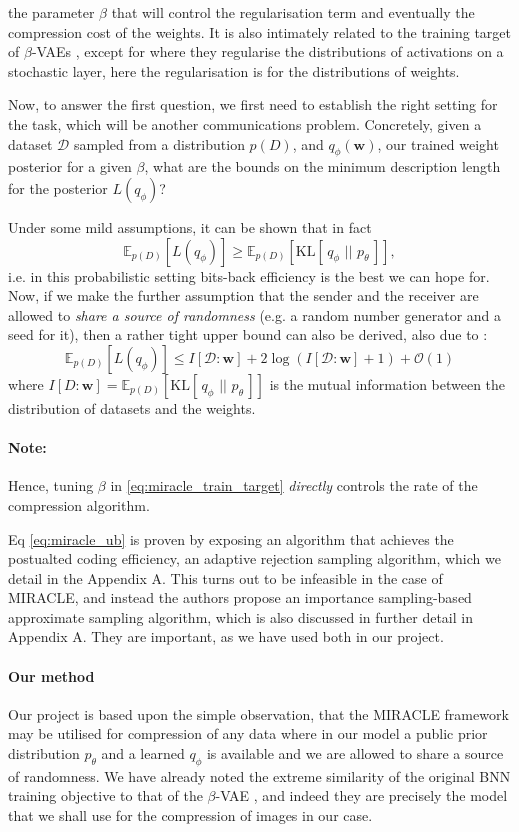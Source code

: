 \documentclass{article}
\renewcommand{\vec}[1]{\mathbf{#1}}
\newcommand{\Oh}{\mathcal{O}}
\newcommand{\KL}[2]{\mathrm{KL}[\,#1\,\,||\,\,#2\,]}
\newcommand{\Exp}{\mathbb{E}}
\newcommand{\Data}{\mathcal{D}}
\begin{document}
the parameter $\beta$ that will control the regularisation term and eventually
the compression cost of the weights. It is also intimately related to the
training target of $\beta$-VAEs \cite{higgins2017beta}, except for where they
regularise the distributions of activations on a stochastic layer, here the
regularisation is for the distributions of weights. 
\par
Now, to answer the first question, we first need to establish the right setting
for the task, which will be another communications problem.
Concretely, given a dataset $\Data$ sampled from a distribution $p(D)$, and
$q_\phi(\vec{w})$, our trained weight posterior for a given $\beta$, what are
the bounds on the minimum description length for the posterior $L(q_{\phi})$?
\par
Under some mild assumptions, it can be shown \cite{harsha2007communication} that
in fact
\[
  \Exp_{p(D)}[L(q_{\phi})] \geq \Exp_{p(D)}[\KL{q_{\phi}}{p_{\theta}}],
\]
i.e. in this probabilistic setting bits-back efficiency is the best we can hope
for. Now, if we make the further assumption that the sender and the receiver are
allowed to \textit{share a source of randomness} (e.g. a random number generator
and a seed for it), then a rather tight upper bound can also be derived, also
due to \cite{harsha2007communication}:
\begin{equation}
\label{eq:miracle_ub}
  \Exp_{p(D)}[L(q_{\phi})] \leq I[\Data : \vec{w}] + 2 \log \left( I[\Data :
    \vec{w}] + 1 \right) + \Oh(1)
\end{equation}
where $I[D : \vec{w}] = \Exp_{p(D)}[\KL{q_{\phi}}{p_{\theta}}]$ is the
mutual information between the distribution of datasets and the weights.
\paragraph{Note:} Hence, tuning $\beta$ in \ref{eq:miracle_train_target}
\textit{directly} controls the rate of the compression algorithm.
\par
Eq \ref{eq:miracle_ub} is proven by exposing an algorithm that achieves the
postualted coding efficiency, an adaptive rejection sampling algorithm, which we
detail in the Appendix A. This turns out to be infeasible in the case of
MIRACLE, and instead the authors propose an importance sampling-based
approximate sampling algorithm, which is also discussed in further detail in
Appendix A. They are important, as we have used both in our project.

\paragraph{Our method} Our project is based upon the simple observation, that
the MIRACLE framework may be utilised for compression of any data where in our
model a public prior distribution $p_{\theta}$ and a learned $q_{\phi}$ is
available and we are allowed to share a source of randomness. We have already
noted the extreme similarity of the original BNN training objective to that of
the $\beta$-VAE \cite{higgins2017beta}, and indeed they are precisely the model
that we shall use for the compression of images in our case.
\end{document}
